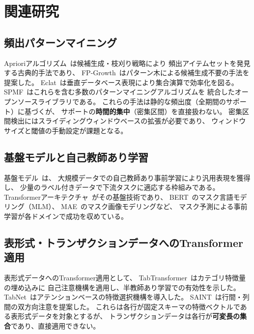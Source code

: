 \documentclass[sigconf,nonacm]{acmart}
\begin{document}
\section{関連研究}
\label{sec:related}

\subsection{頻出パターンマイニング}

Aprioriアルゴリズム~\cite{agrawal1994fast}は候補生成・枝刈り戦略により
頻出アイテムセットを発見する古典的手法であり、
FP-Growth~\cite{han2004mining}はパターン木による候補生成不要の手法を提案した。
Eclat~\cite{zaki2000scalable}は垂直データベース表現により集合演算で効率化を図る。
SPMF~\cite{fournier2017spmf}はこれらを含む多数のパターンマイニングアルゴリズムを
統合したオープンソースライブラリである。
これらの手法は静的な頻出度（全期間のサポート）に基づくが、
サポートの\textbf{時間的集中}（密集区間）を直接扱わない。
密集区間検出にはスライディングウィンドウベースの拡張が必要であり、
ウィンドウサイズと閾値の手動設定が課題となる。

\subsection{基盤モデルと自己教師あり学習}

基盤モデル~\cite{bommasani2021opportunities}は、
大規模データでの自己教師あり事前学習により汎用表現を獲得し、
少量のラベル付きデータで下流タスクに適応する枠組みである。
Transformerアーキテクチャ~\cite{vaswani2017attention}がその基盤技術であり、
BERT~\cite{devlin2019bert}のマスク言語モデリング（MLM）、
MAE~\cite{he2022masked}のマスク画像モデリングなど、
マスク予測による事前学習が各ドメインで成功を収めている。

\subsection{表形式・トランザクションデータへのTransformer適用}

表形式データへのTransformer適用として、
TabTransformer~\cite{huang2020tabtransformer}はカテゴリ特徴量の埋め込みに
自己注意機構を適用し、半教師あり学習での有効性を示した。
TabNet~\cite{arik2021tabnet}はアテンションベースの特徴選択機構を導入した。
SAINT~\cite{somepalli2022saint}は行間・列間の双方向注意を提案した。
これらは各行が固定スキーマの特徴ベクトルである表形式データを対象とするが、
トランザクションデータは各行が\textbf{可変長の集合}であり、直接適用できない。
\end{document}
